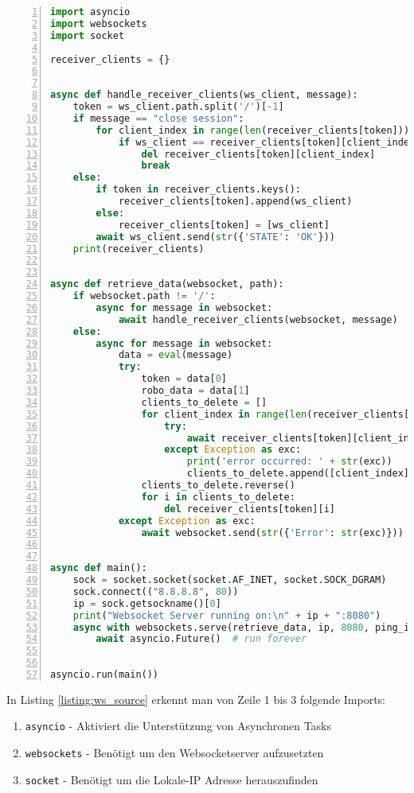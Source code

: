 \documentclass[paper=a4,12pt]{scrreprt}
\begin{document}
\begin{lstlisting}[caption={Websocketserver Sourcecode}, captionpos=b, label={listing:ws_source}, language=python, morekeywords={async, await, with, False, True, None}, numbers=left,
  stepnumber=1]
import asyncio
import websockets
import socket

receiver_clients = {}


async def handle_receiver_clients(ws_client, message):
    token = ws_client.path.split('/')[-1]
    if message == "close session":
        for client_index in range(len(receiver_clients[token])):
            if ws_client == receiver_clients[token][client_index]:
                del receiver_clients[token][client_index]
                break
    else:
        if token in receiver_clients.keys():
            receiver_clients[token].append(ws_client)
        else:
            receiver_clients[token] = [ws_client]
        await ws_client.send(str({'STATE': 'OK'}))
    print(receiver_clients)


async def retrieve_data(websocket, path):
    if websocket.path != '/':
        async for message in websocket:
            await handle_receiver_clients(websocket, message)
    else:
        async for message in websocket:
            data = eval(message)
            try:
                token = data[0]
                robo_data = data[1]
                clients_to_delete = []
                for client_index in range(len(receiver_clients[token])):
                    try:
                        await receiver_clients[token][client_index].send(str(robo_data))
                    except Exception as exc:
                        print('error occurred: ' + str(exc))
                        clients_to_delete.append([client_index])
                clients_to_delete.reverse()
                for i in clients_to_delete:
                    del receiver_clients[token][i]
            except Exception as exc:
                await websocket.send(str({'Error': str(exc)}))


async def main():
    sock = socket.socket(socket.AF_INET, socket.SOCK_DGRAM)
    sock.connect(("8.8.8.8", 80))
    ip = sock.getsockname()[0]
    print("Websocket Server running on:\n" + ip + ":8080")
    async with websockets.serve(retrieve_data, ip, 8080, ping_interval=None, ping_timeout=None):
        await asyncio.Future()  # run forever


asyncio.run(main())
\end{lstlisting}

In Listing \ref{listing:ws_source} erkennt man von Zeile 1 bis 3 folgende Imports:\newline
\begin{enumerate}
  \item \texttt{asyncio}\cite{asyncio} - Aktiviert die Unterstützung von Asynchronen Tasks
  \item \texttt{websockets}\cite{websockets_library} - Benötigt um den Websocketserver aufzusetzten
  \item \texttt{socket}\cite{socket} - Benötigt um die Lokale-IP Adresse herauszufinden
\end{enumerate}
\end{document}
